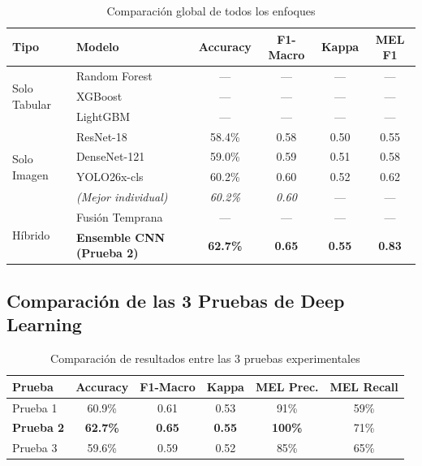 \documentclass[12pt,a4paper]{article}
\begin{document}
\begin{table}[H]
\centering
\begin{tabular}{llcccc}
\toprule
\textbf{Tipo} & \textbf{Modelo} & \textbf{Accuracy} & \textbf{F1-Macro} & \textbf{Kappa} & \textbf{MEL F1} \\
\midrule
\multirow{3}{*}{Solo Tabular}
& Random Forest & --- & --- & --- & --- \\
& XGBoost & --- & --- & --- & --- \\
& LightGBM & --- & --- & --- & --- \\
\midrule
\multirow{4}{*}{Solo Imagen}
& ResNet-18 & 58.4\% & 0.58 & 0.50 & 0.55 \\
& DenseNet-121 & 59.0\% & 0.59 & 0.51 & 0.58 \\
& YOLO26x-cls & 60.2\% & 0.60 & 0.52 & 0.62 \\
& \textit{(Mejor individual)} & \textit{60.2\%} & \textit{0.60} & --- & --- \\
\midrule
\multirow{2}{*}{Híbrido}
& Fusión Temprana & --- & --- & --- & --- \\
& \textbf{Ensemble CNN (Prueba 2)} & \textbf{62.7\%} & \textbf{0.65} & \textbf{0.55} & \textbf{0.83} \\
\bottomrule
\end{tabular}
\caption{Comparación global de todos los enfoques}
\label{tab:comparacion_global}
\end{table}

\subsection{Comparación de las 3 Pruebas de Deep Learning}

\begin{table}[H]
\centering
\begin{tabular}{lccccc}
\toprule
\textbf{Prueba} & \textbf{Accuracy} & \textbf{F1-Macro} & \textbf{Kappa} & \textbf{MEL Prec.} & \textbf{MEL Recall} \\
\midrule
Prueba 1 & 60.9\% & 0.61 & 0.53 & 91\% & 59\% \\
\rowcolor{green!20} \textbf{Prueba 2} & \textbf{62.7\%} & \textbf{0.65} & \textbf{0.55} & \textbf{100\%} & 71\% \\
Prueba 3 & 59.6\% & 0.59 & 0.52 & 85\% & 65\% \\
\bottomrule
\end{tabular}
\caption{Comparación de resultados entre las 3 pruebas experimentales}
\label{tab:comparacion_pruebas_resultados}
\end{table}
\end{document}
